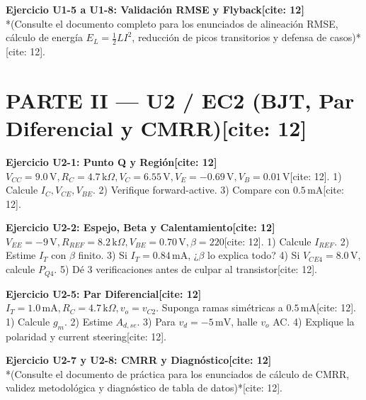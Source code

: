 \documentclass[11pt, a4paper]{article}
\begin{document}
\vspace{0.2cm}
\textbf{Ejercicio U1-5 a U1-8: Validación RMSE y Flyback[cite: 12]} \\
*(Consulte el documento completo para los enunciados de alineación RMSE, cálculo de energía $E_L = \frac{1}{2} L I^2$, reducción de picos transitorios y defensa de casos)*[cite: 12].

\section*{PARTE II — U2 / EC2 (BJT, Par Diferencial y CMRR)[cite: 12]}

\textbf{Ejercicio U2-1: Punto Q y Región[cite: 12]} \\
$V_{CC}=9.0\,\text{V}, R_C=4.7\,\text{k}\Omega, V_C=6.55\,\text{V}, V_E=-0.69\,\text{V}, V_B=0.01\,\text{V}$[cite: 12].
1) Calcule $I_C, V_{CE}, V_{BE}$. 2) Verifique forward-active. 3) Compare con $0.5\,\text{mA}$[cite: 12].

\vspace{0.2cm}
\textbf{Ejercicio U2-2: Espejo, Beta y Calentamiento[cite: 12]} \\
$V_{EE}=-9\,\text{V}, R_{REF}=8.2\,\text{k}\Omega, V_{BE}=0.70\,\text{V}, \beta=220$[cite: 12].
1) Calcule $I_{REF}$. 2) Estime $I_T$ con $\beta$ finito. 3) Si $I_T=0.84\,\text{mA}$, ¿$\beta$ lo explica todo? 4) Si $V_{CE4}=8.0\,\text{V}$, calcule $P_{Q4}$. 5) Dé 3 verificaciones antes de culpar al transistor[cite: 12].

\vspace{0.2cm}
\textbf{Ejercicio U2-5: Par Diferencial[cite: 12]} \\
$I_T=1.0\,\text{mA}, R_C=4.7\,\text{k}\Omega, v_o=v_{C2}$. Suponga ramas simétricas a $0.5\,\text{mA}$[cite: 12].
1) Calcule $g_m$. 2) Estime $A_{d,se}$. 3) Para $v_d=-5\,\text{mV}$, halle $v_o$ AC. 4) Explique la polaridad y current steering[cite: 12].

\vspace{0.2cm}
\textbf{Ejercicio U2-7 y U2-8: CMRR y Diagnóstico[cite: 12]} \\
*(Consulte el documento de práctica para los enunciados de cálculo de CMRR, validez metodológica y diagnóstico de tabla de datos)*[cite: 12].
\end{document}
